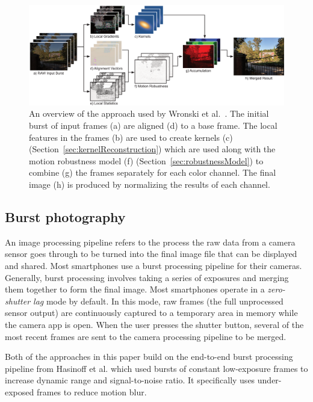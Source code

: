 \documentclass{sig-alternate}
\begin{document}
\begin{figure}[t]
\centering
\includegraphics[width=\textwidth]{Wronski2019-figure-2}
\caption{An overview of the approach used by Wronski et al.~\cite{Wronski2019}. The initial burst of input frames (a) are aligned (d) to a base frame. The local features in the frames (b) are used to create kernels (c) (Section~\ref{sec:kernelReconstruction}) which are used along with the motion robustness model (f) (Section~\ref{sec:robustnessModel}) to combine (g) the frames separately for each color channel. The final image (h) is produced by normalizing the results of each channel.}
\label{fig:Wronski2019Fig2}
\end{figure}

\pagebreak

\subsection{Burst photography}
\label{sec:background:burstPhotography}

An image processing pipeline refers to the process the raw data from a camera sensor goes through to be turned into the final image file that can be displayed and shared. 
Most smartphones use a burst processing pipeline for their cameras. Generally, burst processing involves taking a series of exposures and merging them together to form the final image. Most smartphones operate in a \emph{zero-shutter lag} mode by default. In this mode, raw frames (the full unprocessed sensor output) are continuously captured to a temporary area in memory while the camera app is open. When the user presses the shutter button, several of the most recent frames are sent to the camera processing pipeline to be merged.

Both of the approaches in this paper build on the end-to-end burst processing pipeline from Hasinoff et al. \cite{Hasinoff2016} which used bursts of constant low-exposure frames to increase dynamic range and signal-to-noise ratio. It specifically uses under-exposed frames to reduce motion blur.
\end{document}
